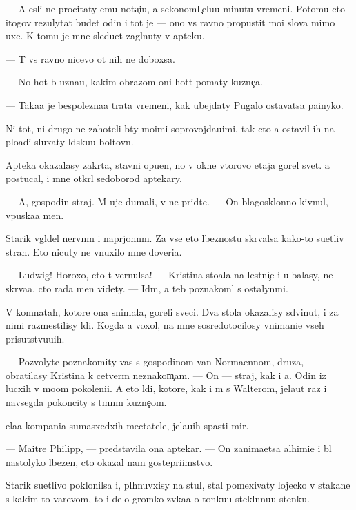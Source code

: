\documentclass[10pt]{book}
\begin{document}
— A {\y}esli ne procitaty {\y}emu nota{\c}i{\y}u, {\y}a sekonoml{\iu} {\c}elu{\y}u minutu vremeni. Potomu cto itogov{\yi}{\y} rezulytat budet odin i tot je — ono vs{\e} ravno propustit mo{\y}i slova mimo uxe{\y}. K tomu je mne sledu{\y}et zagl{\ia}nuty v apteku.

— T{\yi} vs{\e} ravno nicevo ot nih ne dob{\y}oxsa.

— No hot{\ia} b{\yi} uzna{\y}u, kakim obrazom oni hot{\ia}t po{\y}maty kuzne{\c}a.

— Taka{\y}a je bespolezna{\y}a trata vremeni, kak ubejdaty Pugalo ostavatsa pa{\y}inyko{\y}.

Ni tot, ni drugo{\y} ne zahoteli b{\yi}ty mo{\y}imi soprovojda{\y}u{\x}imi, tak cto {\y}a ostavil ih na plo{\x}adi sluxaty l{\iu}dsku{\y}u boltovn{\iu}.

Apteka okazalasy zakr{\yi}ta, stavni opu{\x}en{\yi}, no v okne vtorovo etaja gorel svet. {\Y}a postucal, i mne otkr{\yi}l sedoborod{\yi}{\y} aptekary.

— A, gospodin straj. M{\yi} uje dumali, v{\yi} ne prid{\e}te. — On blagosklonno kivnul, vpuska{\y}a men{\ia}.

Starik v{\yi}gl{\ia}del nervn{\yi}m i napr{\ia}jonn{\yi}m. Za vse{\y} eto{\y} l{\iu}beznost{\y}u skr{\yi}valsa kako{\y}-to su{\y}etliv{\yi}{\y} strah. Eto nicuty ne vnuxilo mne doveri{\y}a.

— Ludwig! Horoxo, cto t{\yi} vernulsa! — Kristina sto{\y}ala na lestni{\c}e i ul{\yi}balasy, ne skr{\yi}va{\y}a, cto rada men{\ia} videty. — Id{\e}m, {\y}a teb{\ia} poznakoml{\iu} s ostalyn{\yi}mi.

V komnatah, kotor{\yi}{\y}e ona snimala, goreli sveci. Dva stola okazalisy sdvinut{\yi}, i za nimi razmestilisy l{\iu}di. Kogda {\y}a  voxol, na mne sosredotocilosy vnimani{\y}e vseh prisutstvu{\y}u{\x}ih.

— Pozvolyte poznakomity vas s gospodinom van Normaennom, druz{\y}a, — obratilasy Kristina k cetver{\yi}m neznakom{\c}am. — On — straj, kak i {\y}a. Odin iz lucxih v mo{\y}om pokoleni{\y}i. A eto l{\iu}di, kotor{\yi}{\y}e, kak i m{\yi} s Walterom, jela{\y}ut raz i navsegda pokoncity s t{\e}mn{\yi}m kuzne{\c}om.

{\C}ela{\y}a kompani{\y}a sumasxedxih mectatele{\y}, jela{\y}u{\x}ih spasti mir.

— Maitre Philipp, — predstavila ona aptekar{\ia}. — On zanima{\y}etsa alhimi{\y}e{\y} i b{\yi}l nastolyko l{\iu}bezen, cto okazal nam gostepri{\y}imstvo.

Starik su{\y}etlivo poklonilsa i, pl{\iu}hnuvxisy na stul, stal pomexivaty lojecko{\y} v stakane s kakim-to varevom, to i delo gromko zv{\ia}ka{\y}a o tonku{\y}u stekl{\ia}nnu{\y}u stenku.
\end{document}
